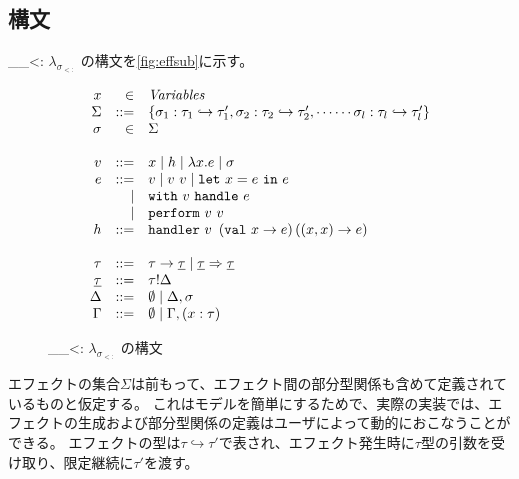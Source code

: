\documentclass{ltjsarticle}
\def\effsub{
  \ifmmode
    \lambda_{\sigma_{<:}}
  \else
    $\lambda_{\sigma_{<:}}$
  \fi
}
\begin{document}
\subsection{構文}
\effsub{}の構文を\autoref{fig:effsub}に示す。
\begin{figure}[ht]
  \begin{framed}
    \[
      \begin{array}{rrl}
        x & \in & \variable{Variables}\\
        \Sigma&::=& \left\{\sigma_1: \tau_1\hookrightarrow\tau_1', \sigma_2: \tau_2\hookrightarrow\tau_2', \cdots\cdots\sigma_l:\tau_l\hookrightarrow\tau_l'\right\}\\
        \sigma & \in & \Sigma\\
                       &&\\
        v & ::= & x \mid h \mid \lambda x. e \mid \sigma\\
        e & ::= & v \mid v\ v \mid \letT{x}{e}{e}\\
          &\mid & \withhandle{v\ }{e} \\
          &\mid & \performK v\ v\\
        h & ::= & \handlerK v\ \left(\keyword{val} x \rightarrow e\right) \left(\left(x, x\right)\rightarrow e\right)\\
          &&\\
        \tau&::=& \tau\rightarrow \underline{\tau} \mid \underline{\tau} \Rightarrow \underline{\tau} \\
        \underline{\tau}&::=& \tau!\Delta \\
        \Delta &::=& \emptyset \mid \Delta, \sigma \\
        \Gamma &::=& \emptyset \mid \Gamma, \left(x : \tau\right)
      \end{array}
    \]
  \end{framed}

  \caption{\effsub{}の構文}
  \label{fig:effsub}
\end{figure}
エフェクトの集合$\Sigma$は前もって、エフェクト間の部分型関係も含めて定義されているものと仮定する。
これはモデルを簡単にするためで、実際の実装では、エフェクトの生成および部分型関係の定義はユーザによって動的におこなうことができる。
エフェクトの型は$\tau\hookrightarrow\tau'$で表され、エフェクト発生時に$\tau$型の引数を受け取り、限定継続に$\tau'$を渡す。
\end{document}
